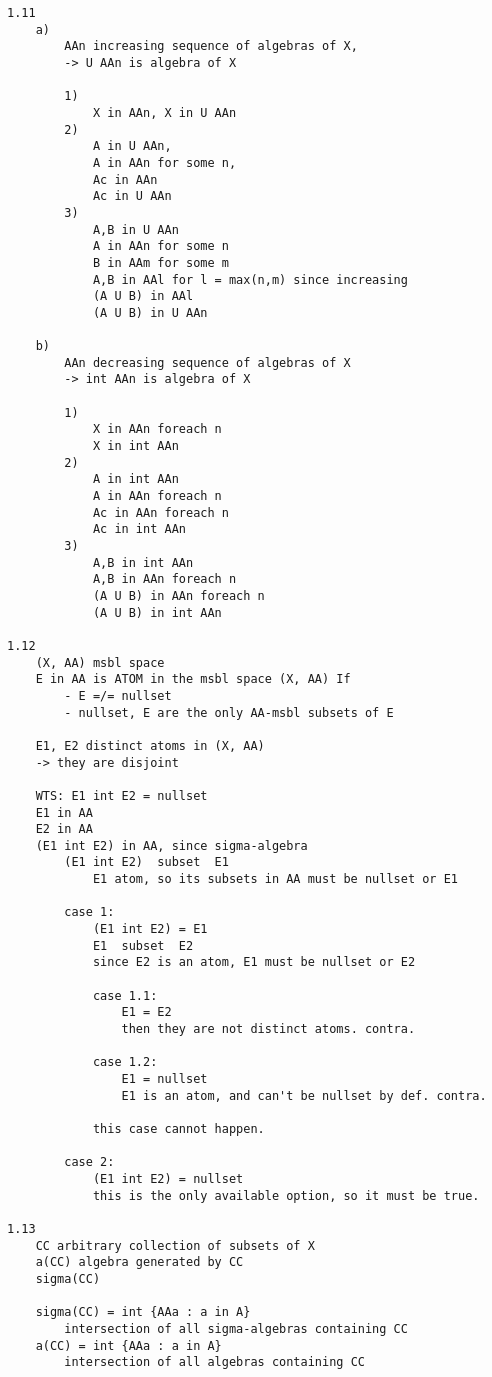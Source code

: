 \documentclass{article}
\begin{document}
\begin{flushleft}
\begin{verbatim}
1.11
    a) 
        AAn increasing sequence of algebras of X, 
        -> U AAn is algebra of X 
    
        1) 
            X in AAn, X in U AAn 
        2) 
            A in U AAn, 
            A in AAn for some n, 
            Ac in AAn 
            Ac in U AAn 
        3)
            A,B in U AAn 
            A in AAn for some n 
            B in AAm for some m 
            A,B in AAl for l = max(n,m) since increasing 
            (A U B) in AAl 
            (A U B) in U AAn 
    
    b)
        AAn decreasing sequence of algebras of X
        -> int AAn is algebra of X 

        1)
            X in AAn foreach n 
            X in int AAn 
        2)
            A in int AAn 
            A in AAn foreach n 
            Ac in AAn foreach n 
            Ac in int AAn 
        3)
            A,B in int AAn 
            A,B in AAn foreach n 
            (A U B) in AAn foreach n 
            (A U B) in int AAn

1.12
    (X, AA) msbl space 
    E in AA is ATOM in the msbl space (X, AA) If
        - E =/= nullset 
        - nullset, E are the only AA-msbl subsets of E

    E1, E2 distinct atoms in (X, AA)
    -> they are disjoint 

    WTS: E1 int E2 = nullset 
    E1 in AA 
    E2 in AA 
    (E1 int E2) in AA, since sigma-algebra 
        (E1 int E2)  subset  E1 
            E1 atom, so its subsets in AA must be nullset or E1
        
        case 1:
            (E1 int E2) = E1 
            E1  subset  E2 
            since E2 is an atom, E1 must be nullset or E2 

            case 1.1:
                E1 = E2 
                then they are not distinct atoms. contra. 
            
            case 1.2:
                E1 = nullset 
                E1 is an atom, and can't be nullset by def. contra.

            this case cannot happen. 

        case 2:
            (E1 int E2) = nullset 
            this is the only available option, so it must be true.

1.13
    CC arbitrary collection of subsets of X 
    a(CC) algebra generated by CC 
    sigma(CC)

    sigma(CC) = int {AAa : a in A}
        intersection of all sigma-algebras containing CC 
    a(CC) = int {AAa : a in A} 
        intersection of all algebras containing CC 


\end{verbatim}
\end{flushleft}
\end{document}
